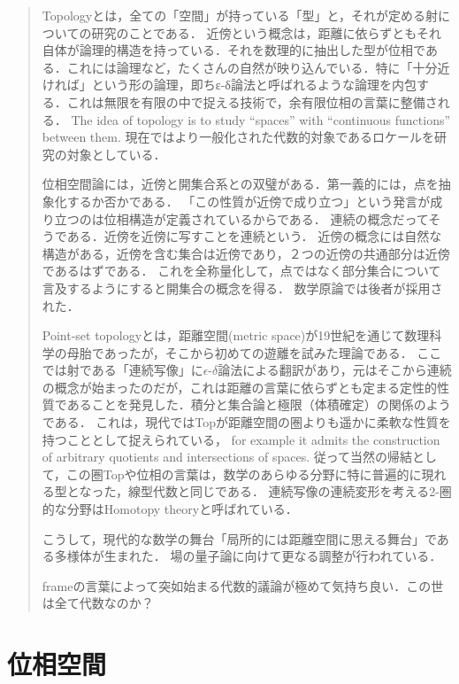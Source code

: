 \documentclass[uplatex,dvipdfmx]{jsreport}
\begin{document}
\begin{quotation}
    Topologyとは，全ての「空間」が持っている「型」と，それが定める射についての研究のことである．
    近傍という概念は，距離に依らずともそれ自体が論理的構造を持っている．それを数理的に抽出した型が位相である．これには論理など，たくさんの自然が映り込んでいる．特に「十分近ければ」という形の論理，即ちε-δ論法と呼ばれるような論理を内包する．これは無限を有限の中で捉える技術で，余有限位相の言葉に整備される．
    The idea of topology is to study “spaces” with “continuous functions” between them.\cite{nLab}
    現在ではより一般化された代数的対象であるロケールを研究の対象としている．

    位相空間論には，近傍と開集合系との双璧がある．第一義的には，点を抽象化するか否かである．
    「この性質が近傍で成り立つ」という発言が成り立つのは位相構造が定義されているからである．
    連続の概念だってそうである．近傍を近傍に写すことを連続という．
    近傍の概念には自然な構造がある，近傍を含む集合は近傍であり，２つの近傍の共通部分は近傍であるはずである．
    これを全称量化して，点ではなく部分集合について言及するようにすると開集合の概念を得る．
    数学原論では後者が採用された．

    Point-set topologyとは，距離空間(metric space)が19世紀を通じて数理科学の母胎であったが，そこから初めての遊離を試みた理論である．
    ここでは射である「連続写像」に$\epsilon$-$\delta$論法による翻訳があり，元はそこから連続の概念が始まったのだが，これは距離の言葉に依らずとも定まる定性的性質であることを発見した．積分と集合論と極限（体積確定）の関係のようである．
    これは，現代ではTopが距離空間の圏よりも遥かに柔軟な性質を持つこととして捉えられている， for example it admits the construction of arbitrary quotients and intersections of spaces.
    従って当然の帰結として，この圏Topや位相の言葉は，数学のあらゆる分野に特に普遍的に現れる型となった，線型代数と同じである．
    連続写像の連続変形を考える2-圏的な分野はHomotopy theoryと呼ばれている．

    こうして，現代的な数学の舞台「局所的には距離空間に思える舞台」である多様体が生まれた．
    場の量子論に向けて更なる調整が行われている．

    frameの言葉によって突如始まる代数的議論が極めて気持ち良い．この世は全て代数なのか？
\end{quotation}

\section{位相空間}
\end{document}
